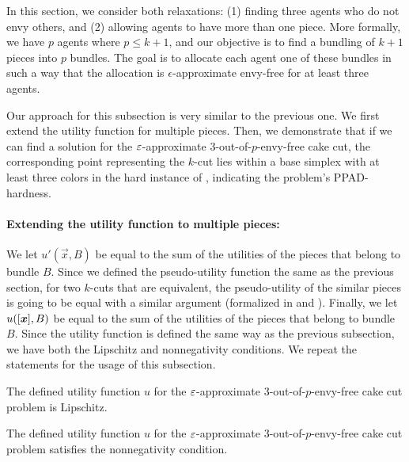 In this section, we consider both relaxations: (1) finding three agents who do not envy others, and (2) allowing agents to have more than one piece. More formally, we have $p$ agents where $p \leq k + 1$, and our objective is to find a bundling of $k + 1$ pieces into $p$ bundles.  The goal is to allocate each agent one of these bundles in such a way that the allocation is $\epsilon$-approximate envy-free for at least three agents.

\poutofqcakecut*


Our approach for this subsection is very similar to the previous one. We first extend the utility function for multiple pieces. Then, we demonstrate that if we can find a solution for the $\varepsilon$-approximate 3-out-of-$p$-envy-free cake cut, the corresponding point representing the $k$-cut lies within a base simplex with at least three colors in the hard instance of , indicating the problem's PPAD-hardness. 


\paragraph{Extending the utility function to multiple pieces:} We let $u'(\vec{x}, B)$ be equal to the sum of the utilities of the pieces that belong to bundle $B$. Since we defined the pseudo-utility function the same as the previous section, for two $k$-cuts that are equivalent, the pseudo-utility of the similar pieces is going to be equal with a similar argument (formalized in  and ). Finally, we let $u([\boldsymbol{x}], B)$ be equal to the sum of the utilities of the pieces that belong to bundle $B$. Since the utility function is defined the same way as the previous subsection, we have both the Lipschitz and nonnegativity conditions. We repeat the statements for the usage of this subsection.












\begin{claim}\label{clm:three-agent-lipschitz-holds}
    The defined utility function $u$ for the $\varepsilon$-approximate 3-out-of-$p$-envy-free cake cut problem is Lipschitz.
\end{claim}


\begin{claim}\label{clm:three-agent-nonnegativity-holds}
    The defined utility function $u$ for the $\varepsilon$-approximate 3-out-of-$p$-envy-free cake cut problem satisfies the nonnegativity condition.
\end{claim}




